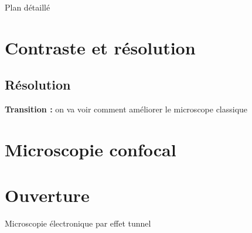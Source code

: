 \begin{reportBlock}{Plan détaillé}
  \section{Contraste et résolution}

  \subsection{Résolution}
  

\textbf{Transition :} on va voir comment améliorer le microscope classique

\section{Microscopie confocal}

\section*{Ouverture}
Microscopie électronique par effet tunnel

\end{reportBlock}